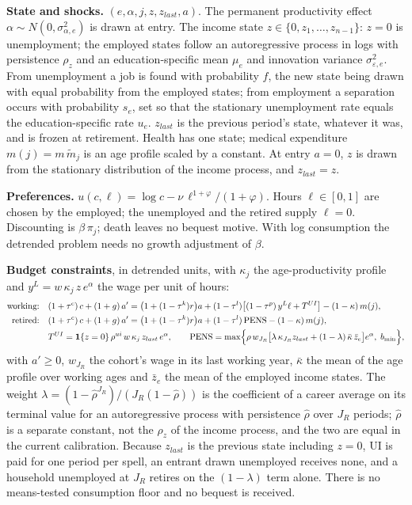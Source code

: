\documentclass[11pt,a4paper]{article}
\begin{document}
\textbf{State and shocks.} $(e, \alpha, j, z, z_{last}, a)$. The permanent productivity effect $\alpha \sim N(0, \sigma^{2}_{\alpha,e})$ is drawn at entry. The income state $z \in \{0, z_1, \dots, z_{n-1}\}$: $z = 0$ is unemployment; the employed states follow an autoregressive process in logs with persistence $\rho_z$ and an education-specific mean $\mu_e$ and innovation variance $\sigma^2_{\varepsilon,e}$. From unemployment a job is found with probability $f$, the new state being drawn with equal probability from the employed states; from employment a separation occurs with probability $s_e$, set so that the stationary unemployment rate equals the education-specific rate $u_e$. $z_{last}$ is the previous period's state, whatever it was, and is frozen at retirement. Health has one state; medical expenditure $m(j) = m\,\tilde{m}_j$ is an age profile scaled by a constant. At entry $a = 0$, $z$ is drawn from the stationary distribution of the income process, and $z_{last} = z$.

\textbf{Preferences.} $u(c, \ell) = \log c - \nu\,\ell^{1+\varphi}/(1+\varphi)$. Hours $\ell \in [0, 1]$ are chosen by the employed; the unemployed and the retired supply $\ell = 0$. Discounting is $\beta\,\pi_j$; death leaves no bequest motive. With log consumption the detrended problem needs no growth adjustment of $\beta$.

\textbf{Budget constraints}, in detrended units, with $\kappa_j$ the age-productivity profile and $y^L = w\,\kappa_j\,z\,e^{\alpha}$ the wage per unit of hours:
\begin{align}
\text{working:}\quad & (1+\tau^c)\,c + (1+g)\,a' = \bigl(1 + (1-\tau^k) r\bigr) a + (1-\tau^l)\bigl[(1-\tau^p)\, y^L \ell + T^{UI}\bigr] - (1-\kappa)\, m(j), \label{eq:bcw}\\
\text{retired:}\quad & (1+\tau^c)\,c + (1+g)\,a' = \bigl(1 + (1-\tau^k) r\bigr) a + (1-\tau^l)\,\mathrm{PENS} - (1-\kappa)\, m(j), \label{eq:bcr}\\
& T^{UI} = \mathbf{1}\{z = 0\}\,\rho^{ui}\, w\, \kappa_j\, z_{last}\, e^{\alpha}, \qquad
\mathrm{PENS} = \max\Bigl\{\rho\, w_{J_R}\bigl[\lambda\,\kappa_{J_R} z_{last} + (1-\lambda)\,\bar{\kappa}\,\bar{z}_e\bigr] e^{\alpha},\; b_{\min}\Bigr\}, \label{eq:pens}
\end{align}
with $a' \ge 0$, $w_{J_R}$ the cohort's wage in its last working year, $\bar{\kappa}$ the mean of the age profile over working ages and $\bar{z}_e$ the mean of the employed income states. The weight $\lambda = (1 - \hat\rho^{J_R})/(J_R(1-\hat\rho))$ is the coefficient of a career average on its terminal value for an autoregressive process with persistence $\hat\rho$ over $J_R$ periods; $\hat\rho$ is a separate constant, not the $\rho_z$ of the income process, and the two are equal in the current calibration. Because $z_{last}$ is the previous state including $z = 0$, UI is paid for one period per spell, an entrant drawn unemployed receives none, and a household unemployed at $J_R$ retires on the $(1-\lambda)$ term alone. There is no means-tested consumption floor and no bequest is received.
\end{document}
